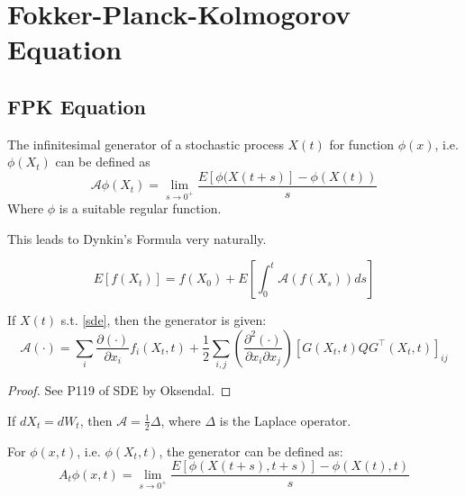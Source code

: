 \section{Fokker-Planck-Kolmogorov Equation}
\subsection{FPK Equation}
\begin{definition}[Generator]
    The infinitesimal generator of a stochastic process $X(t)$ for function $\phi(x)$, i.e. $\phi(X_t)$ can be defined as
    \begin{equation}
        \mathcal{A} \phi(X_t)=\lim _{s \rightarrow 0^{+}} \frac{E[\phi(X(t+s)]-\phi(X(t))}{s}
    \end{equation}
    Where  $\phi$  is a suitable regular function.
\end{definition}
This leads to Dynkin's Formula very naturally.
\begin{theorem}
    \begin{equation}
        E[f(X_t)]=f(X_0)+E\left[\int_0^t\mathcal{A}(f(X_s))ds\right]
    \end{equation}
\end{theorem}

\begin{theorem}
    If  $X(t)$  s.t. \ref{sde}, then the generator is given:
\begin{equation}
    \mathcal{A}(\cdot)=\sum_{i} \frac{\partial(\cdot)}{\partial x_{i}} f_{i}(X_t, t)+\frac{1}{2} \sum_{i, j}\left(\frac{\partial^{2}(\cdot)}{\partial x_{i} \partial x_{j}}\right)\left[G(X_t, t)Q G^{\top}(X_t, t)\right]_{i j}
\end{equation}
\end{theorem}
\begin{proof}
    See P119 of SDE by Oksendal.
\end{proof}

\begin{example}
    If $dX_t=dW_t$, then $\mathcal{A}=\frac{1}{2}\Delta$, where $\Delta$ is the Laplace operator.
\end{example}

\begin{definition}
    For $\phi(x, t)$, i.e. $\phi(X_t, t)$, the generator can be defined as:
    \begin{equation}
        A_{t} \phi(x, t)=\lim _{s \rightarrow 0^{+}} \frac{E[\phi(X(t+s), t+s)]-\phi(X(t), t)}{s}
    \end{equation}
\end{definition}

